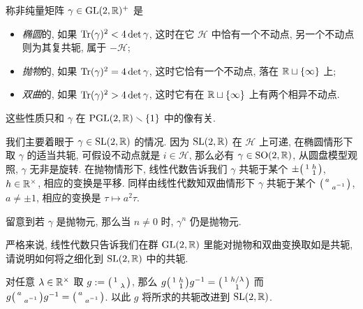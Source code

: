 \begin{definition}\label{def:classification-matrices}   
	称非纯量矩阵 $\gamma \in \operatorname{GL}(2,\mathbb{R})^+$ 是
	\begin{itemize}
		\item \emph{椭圆}的, 如果 $\operatorname{Tr}(\gamma)^2 < 4\det\gamma$, 这时在它 $\mathcal{H}$ 中恰有一个不动点, 另一个不动点则为其复共轭, 属于 $-\mathcal{H}$;
		\item \emph{抛物}的, 如果 $\operatorname{Tr}(\gamma)^2 = 4\det\gamma$, 这时它恰有一个不动点, 落在 $\mathbb{R} \sqcup \{\infty\}$ 上;
		\item \emph{双曲}的, 如果 $\operatorname{Tr}(\gamma)^2 > 4\det\gamma$, 这时它有在 $\mathbb{R} \sqcup \{\infty\}$ 上有两个相异不动点.
	\end{itemize}
	这些性质只和 $\gamma$ 在 $\operatorname{PGL}(2,\mathbb{R}) \smallsetminus \{1\}$ 中的像有关.
\end{definition}

我们主要着眼于 $\gamma \in \operatorname{SL}(2,\mathbb{R})$ 的情况. 因为 $\operatorname{SL}(2,\mathbb{R})$ 在 $\mathcal{H}$ 上可递, 在椭圆情形下取 $\gamma$ 的适当共轭, 可假设不动点就是 $i \in \mathcal{H}$, 那么必有 $\gamma \in \operatorname{SO}(2,\mathbb{R})$, 从圆盘模型观照, $\gamma$ 无非是旋转. 在抛物情形下, 线性代数告诉我们 $\gamma$ 共轭于某个 $\pm\bigl(\begin{smallmatrix} 1 & h \\  & 1 \end{smallmatrix}\bigr)$, $h \in \mathbb{R}^\times$, 相应的变换是平移. 同样由线性代数知双曲情形下 $\gamma$ 共轭于某个 $\bigl(\begin{smallmatrix} a &  \\  & a^{-1} \end{smallmatrix}\bigr)$, $a \neq \pm 1$, 相应的变换是 $\tau \mapsto a^2\tau$.

留意到若 $\gamma$ 是抛物元, 那么当 $n \neq 0$ 时, $\gamma^n$ 仍是抛物元.

\begin{exercise}
	严格来说, 线性代数只告诉我们在群 $\operatorname{GL}(2,\mathbb{R})$ 里能对抛物和双曲变换取如是共轭, 请说明如何将之细化到 $\operatorname{SL}(2,\mathbb{R})$ 中的共轭.

	\begin{hint}
		对任意 $\lambda \in \mathbb{R}^\times$ 取 $g := \bigl(\begin{smallmatrix} 1 &  \\  & \lambda \end{smallmatrix}\bigr)$, 那么 $g \bigl(\begin{smallmatrix} 1 & h \\  & 1 \end{smallmatrix}\bigr) g^{-1} = \bigl(\begin{smallmatrix} 1 & h/\lambda \\  & 1 \end{smallmatrix}\bigr)$ 而 $g\bigl(\begin{smallmatrix} a &  \\  & a^{-1} \end{smallmatrix}\bigr) g^{-1} = \bigl(\begin{smallmatrix} a &  \\  & a^{-1} \end{smallmatrix}\bigr)$. 以此 $g$ 将所求的共轭改进到 $\operatorname{SL}(2, \mathbb{R})$.
	\end{hint}
\end{exercise}

